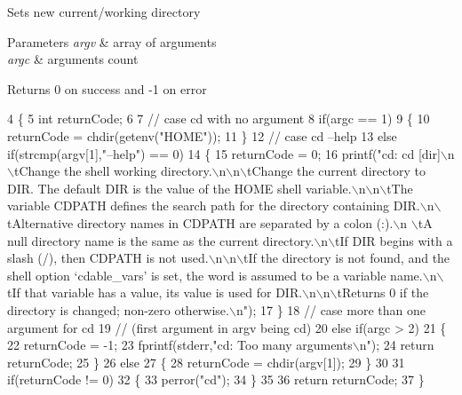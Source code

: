 Sets new current/working directory 
\begin{DoxyParams}{Parameters}
{\em argv} & array of arguments \\
\hline
{\em argc} & arguments count\\
\hline
\end{DoxyParams}
\begin{DoxyReturn}{Returns}
0 on success and -\/1 on error 
\end{DoxyReturn}

\begin{DoxyCode}
4 \{
5     \textcolor{keywordtype}{int} returnCode;
6 
7     \textcolor{comment}{// case cd with no argument}
8     \textcolor{keywordflow}{if}(argc == 1)
9     \{
10         returnCode = chdir(getenv(\textcolor{stringliteral}{"HOME"}));
11     \}
12     \textcolor{comment}{// case cd --help}
13     \textcolor{keywordflow}{else} \textcolor{keywordflow}{if}(strcmp(argv[1],\textcolor{stringliteral}{"--help"}) == 0)
14     \{
15         returnCode = 0;
16         printf(\textcolor{stringliteral}{"cd: cd [dir]\(\backslash\)n\(\backslash\)tChange the shell working directory.\(\backslash\)n\(\backslash\)n\(\backslash\)tChange the current directory to
       DIR.  The default DIR is the value of the HOME shell variable.\(\backslash\)n\(\backslash\)n\(\backslash\)tThe variable CDPATH defines the search
       path for the directory containing DIR.\(\backslash\)n\(\backslash\)tAlternative directory names in CDPATH are separated by a colon (:).\(\backslash\)n
      \(\backslash\)tA null directory name is the same as the current directory.\(\backslash\)n\(\backslash\)tIf DIR begins with a slash (/), then CDPATH
       is not used.\(\backslash\)n\(\backslash\)n\(\backslash\)tIf the directory is not found, and the shell option `cdable\_vars' is set, the word is
       assumed to be  a variable name.\(\backslash\)n\(\backslash\)tIf that variable has a value, its value is used for DIR.\(\backslash\)n\(\backslash\)n\(\backslash\)tReturns 0 if
       the directory is changed; non-zero otherwise.\(\backslash\)n"});
17     \}
18     \textcolor{comment}{// case more than one argument for cd}
19     \textcolor{comment}{// (first argument in argv being cd)}
20     \textcolor{keywordflow}{else} \textcolor{keywordflow}{if}(argc > 2)
21     \{
22         returnCode = -1;
23         fprintf(stderr,\textcolor{stringliteral}{"cd: Too many arguments\(\backslash\)n"});
24         \textcolor{keywordflow}{return} returnCode;
25     \}
26     \textcolor{keywordflow}{else}
27     \{
28         returnCode = chdir(argv[1]);
29     \}
30 
31     \textcolor{keywordflow}{if}(returnCode != 0)
32     \{
33         perror(\textcolor{stringliteral}{"cd"});
34     \}
35 
36     \textcolor{keywordflow}{return} returnCode;
37 \}
\end{DoxyCode}
\mbox{\label{built-in_8h_ae985125913017d37bb75b1ab7b977950}} 
